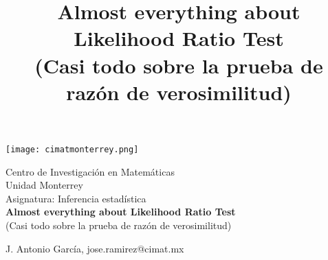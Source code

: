 \begin{titlepage}

\texttt{[image: cimatmonterrey.png]}
\begin{center}
\Huge{Centro de Investigación en Matemáticas } \\
\vspace*{0.2in}
\huge{Unidad Monterrey}\\
\vspace*{0.2in}
Asignatura: Inferencia estadística\\
\vspace*{0.2in}
\textbf{Almost everything about Likelihood Ratio Test}\\
\vspace*{0.1in}
\large({Casi todo sobre la prueba de razón de verosimilitud})
\title{\textbf{Almost everything about Likelihood Ratio Test}\\ \large{(Casi todo sobre la prueba de razón de verosimilitud)}} 

\vspace*{0.2in}

\Large{J. Antonio García, jose.ramirez@cimat.mx}



\end{center}


\end{titlepage}